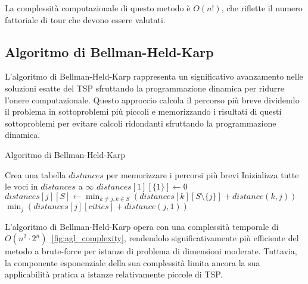 La complessità computazionale di questo metodo è $O(n!)$, che riflette il numero fattoriale di tour che devono essere valutati.

\subsection{Algoritmo di Bellman-Held-Karp}

L'algoritmo di Bellman-Held-Karp rappresenta un significativo avanzamento nelle soluzioni esatte del \Gls{TSP} sfruttando la programmazione dinamica per ridurre l'onere computazionale. Questo approccio calcola il percorso più breve dividendo il problema in sottoproblemi più piccoli e memorizzando i risultati di questi sottoproblemi per evitare calcoli ridondanti sfruttando la programmazione dinamica.

\begin{algorithm}
	\caption{Algoritmo di Bellman-Held-Karp}\label{bellmanheldkarp}
	\begin{algorithmic}[1]
		\State Crea una tabella $distances$ per memorizzare i percorsi più brevi
		\State Inizializza tutte le voci in $distances$ a $\infty$
		\State $distances[1][\{1\}] \gets 0$ 
		\State $distances[j][S] \gets \min_{k \neq j, k \in S} (distances[k][S\setminus\{j\}] + distance(k, j))$
		\EndFor
		\EndFor
		\EndFor
		\State \Return $\min_{j}(distances[j][cities] + distance(j, 1))$
		\EndProcedure
	\end{algorithmic}
\end{algorithm}

L'algoritmo di Bellman-Held-Karp opera con una complessità temporale di $O(n^2 \cdot 2^n)$~\ref{fig:agl_complexity}, rendendolo significativamente più efficiente del metodo a brute-force per istanze di problema di dimensioni moderate. Tuttavia, la componente esponenziale della sua complessità limita ancora la sua applicabilità pratica a istanze relativamente piccole di \Gls{TSP}.


